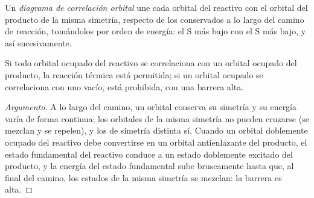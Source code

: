 \begin{definition}\label{def:b3:pericyclic:orbital-correlation}
Un \emph{diagrama de correlación orbital} une
cada orbital del reactivo con el orbital del producto de la misma simetría,
respecto de los  conservados a lo largo del camino de reacción, tomándolos
por orden de energía: el S más bajo con el S más bajo, y así sucesivamente.
\end{definition}

\begin{proposition}\label{prop:b3:pericyclic:correlation}
Si todo orbital ocupado del reactivo se correlaciona con un orbital ocupado del
producto, la reacción térmica está permitida; si un orbital ocupado se correlaciona
con uno vacío, está prohibida, con una barrera alta.
\end{proposition}

\begin{proof}[Argumento]
A lo largo del camino, un orbital conserva su simetría y su energía varía de forma
continua; los orbitales de la misma simetría no pueden cruzarse (se mezclan y se repelen),
y los de simetría distinta sí. Cuando un orbital doblemente ocupado del reactivo
debe convertirse en un orbital antienlazante del producto, el estado fundamental del
reactivo conduce a un estado doblemente excitado del producto, y la energía del estado fundamental
sube bruscamente hasta que, al final del camino, los estados de la misma simetría
se mezclan: la barrera es alta.
\end{proof}

